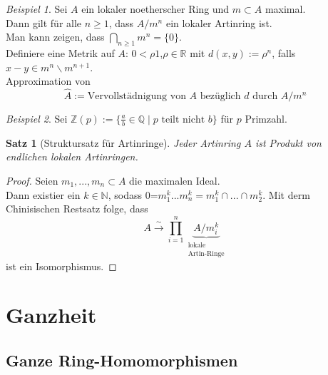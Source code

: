 \documentclass[10pt,a4paper]{article}
\newcommand{\N}{\ensuremath{\mathbb{N}}}
\newcommand{\Z}{\ensuremath{\mathbb{Z}}}
\newcommand{\Q}{\ensuremath{\mathbb{Q}}}
\newcommand{\R}{\ensuremath{\mathbb{R}}}
\newcommand{\isomfunc}{\ensuremath{\xrightarrow{\sim}}}
\newcounter{thm}[section]
\theoremstyle{definition}
\theoremstyle{plain}
\newtheorem{satz}[thm]{Satz}
\theoremstyle{remark}
\newtheorem*{exm*}{Beispiel}
\begin{document}
\begin{exm*}
	Sei $A$ ein lokaler noetherscher Ring und $m\subset A$ maximal.\\
	Dann gilt für alle $n\ge 1$, dass $A/m^n$ ein lokaler Artinring ist.\\
	Man kann zeigen, dass $\bigcap_{n\ge 1}m^n=\{0\}$.\\
	Definiere eine Metrik auf $A$: $0<\rho 1$,$\rho\in \R$  mit $d(x,y):=\rho ^n$, falls $x-y\in m^n\backslash m^{n+1}$.\\
	Approximation von 
	\[\hat A:=\text{Vervollstädnigung  von $A$ bezüglich $d$ durch $A/m^n$}\]
\end{exm*}
\begin{exm*}
	Sei $\Z(p):=\{\frac{a}{b}\in\Q\mid \text{$p$ teilt nicht $b$}\}$ für $p$ Primzahl.
\end{exm*}
\begin{satz}[Struktursatz für Artinringe]\label{528Struktursatz}
	Jeder Artinring $A$ ist Produkt von endlichen lokalen Artinringen.
\end{satz}
\begin{proof}
	Seien $m_1,...,m_n\subset A$ die maximalen Ideal.\\
	Dann existier ein $k\in \N$, sodass 0=$m_1^k...m_n^k=m_1^k\cap...\cap m_2^k$.
	Mit derm Chinisischen Restsatz folge, dass
	\[A\isomfunc \prod_{i=1}^{n}\underbrace{A/m_i^k}_{\substack{\text{lokale}\\\text{Artin-Ringe}}}\]
	ist ein Isomorphismus.
\end{proof}




\section{Ganzheit}

\subsection{Ganze Ring-Homomorphismen}
\end{document}
